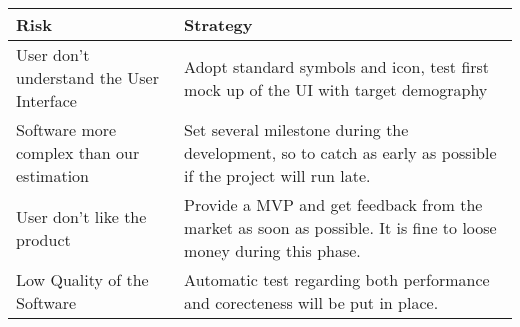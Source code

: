 \documentclass[11pt]{article} %
\begin{document}
\begin{table}[h]
\begin{tabularx}{\textwidth}{ | X | X | } \hline
Risk & Strategy \\ \hline \hline
User don't understand the User Interface & Adopt standard symbols and icon, test first mock up of the UI with target demography \\ \hline
Software more complex than our estimation & Set several milestone during the development, so to catch as early as possible if the project will run late. \\ \hline
User don't like the product & Provide a MVP and get feedback from the market as soon as possible. It is fine to loose money during this phase. \\ \hline
Low Quality of the Software & Automatic test regarding both performance and corecteness will be put in place. \\ \hline
\end{tabularx}
\end{table}
\end{document}
